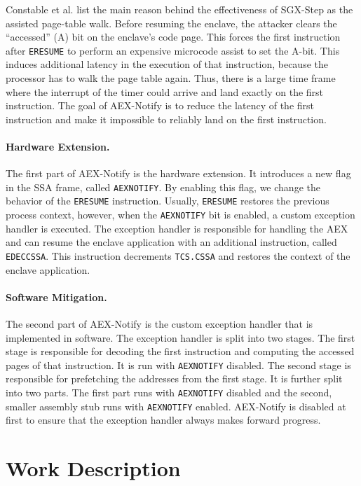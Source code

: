 \documentclass{llncs}
\begin{document}
Constable et al. \cite{ConstableBCXXAK23} list the main reason
behind the effectiveness of SGX-Step as the assisted page-table walk.
Before resuming the enclave, the attacker clears
the ``accessed'' (A) bit on the enclave's code page.
This forces the first instruction after \texttt{ERESUME}
to perform an expensive microcode assist to set the A-bit.
This induces additional latency in the execution of that instruction, because
the processor has to walk the page table again.
Thus, there is a large time frame where the interrupt of the timer could
arrive and land exactly on the first instruction.
The goal of AEX-Notify is to reduce the latency of the first instruction
and make it impossible to reliably land on the first instruction.

\paragraph{Hardware Extension.}
The first part of AEX-Notify is the hardware extension.
It introduces a new flag in the SSA frame, called \texttt{AEXNOTIFY}.
By enabling this flag, we change the behavior of the \texttt{ERESUME} instruction.
Usually, \texttt{ERESUME} restores the previous process context,
however, when the \texttt{AEXNOTIFY} bit is enabled,
a custom exception handler is executed.
The exception handler is responsible for handling the AEX and
can resume the enclave application with an additional instruction, called \texttt{EDECCSSA}.
This instruction decrements \texttt{TCS.CSSA} and restores the context of the enclave application.

\paragraph{Software Mitigation.}
The second part of AEX-Notify is the custom exception handler that is implemented in software.
The exception handler is split into two stages.
The first stage is responsible for decoding the first instruction and
computing the accessed pages of that instruction.
It is run with \texttt{AEXNOTIFY} disabled.
The second stage is responsible for prefetching the addresses from the first stage.
It is further split into two parts.
The first part runs with \texttt{AEXNOTIFY} disabled
and the second, smaller assembly stub runs with \texttt{AEXNOTIFY} enabled.
AEX-Notify is disabled at first to ensure that the exception handler always makes forward progress.

\section{Work Description}
\end{document}
